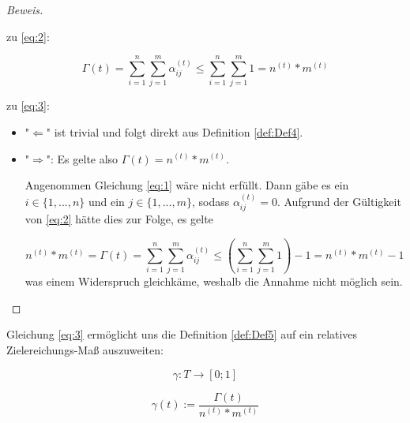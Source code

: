 \documentclass[11pt]{scrartcl}
\begin{document}
\begin{proof}[Beweis] \textrm{ }

\vspace{0.3cm}

  zu \eqref{eq:2}: 
  
\begin{equation*}
  \Gamma(t) = \sum_{i=1}^n \sum_{j=1}^m \alpha^{(t)}_{ij} \leqslant \sum_{i=1}^n \sum_{j=1}^m 1 = n^{(t)} * m^{(t)}
\end{equation*}

\vspace{0.3cm} 

zu \eqref{eq:3}: 

\begin{itemize}
  \item "$\Leftarrow$" ist trivial und folgt direkt aus Definition \ref{def:Def4}.
  \item "$\Rightarrow$": Es gelte also $\Gamma(t) = n^{(t)} * m^{(t)}$.
  
  Angenommen Gleichung \eqref{eq:1} wäre nicht erfüllt. Dann gäbe es ein $i \in \{1,...,n\}$ und ein $j \in \{1,...,m\}$, sodass $\alpha^{(t)}_{ij} = 0$. Aufgrund der Gültigkeit von \eqref{eq:2} hätte dies zur Folge, es gelte
  
\begin{equation*}
  n^{(t)} * m^{(t)} = \Gamma(t) = \sum_{i=1}^n \sum_{j=1}^m \alpha^{(t)}_{ij} \leqslant (\sum_{i=1}^n \sum_{j=1}^m 1) - 1 = n^{(t)} * m^{(t)} - 1
\end{equation*}  
was einem Widerspruch gleichkäme, weshalb die Annahme nicht möglich sein.
  
\end{itemize}
  
\end{proof}

\vspace{0.3cm}

Gleichung \eqref{eq:3} ermöglicht uns die Definition \ref{def:Def5} auf ein relatives Zielereichungs-Maß auszuweiten:

\vspace{0.3cm}

\begin{Def}\label{def:Def6}
\begin{equation*}
  \gamma : T \rightarrow [0; 1] 
\end{equation*}

\begin{equation*}
  \gamma(t):= \frac{\Gamma(t)}{n^{(t)} * m^{(t)}}
\end{equation*}

\end{Def}
\end{document}
